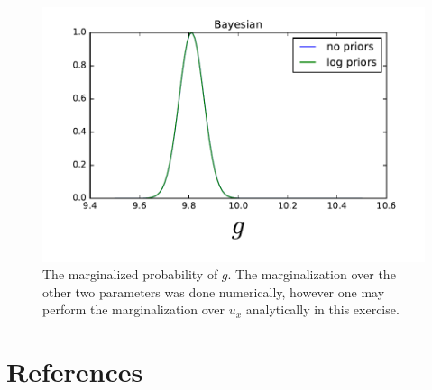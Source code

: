 \documentclass[12pt,a4paper]{article}
\begin{document}
\begin{figure}[ht]
  \centering
  \includegraphics[keepaspectratio]{g_bayesian.pdf}
  \caption{The marginalized probability of $g$. The marginalization
    over the other two parameters was done numerically, however
    one may perform the marginalization over $u_x$ analytically in
    this exercise.}
  \label{fig:g_bayesian}
\end{figure}





\newpage

\section*{References}
\end{document}
